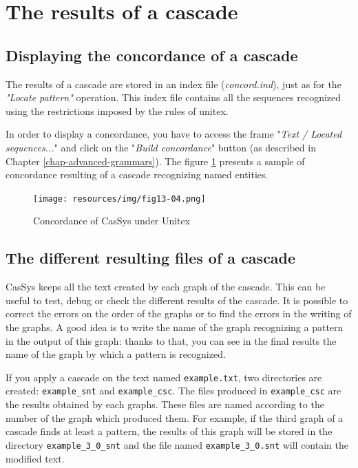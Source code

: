 \section{The results of a cascade}

\subsection{Displaying the concordance of a cascade}
\label{subsec:resultsCascade}

The results of a cascade are stored in an index file (\textit{concord.ind}), just as for the \textit{"Locate pattern"} operation. This index file contains all the sequences recognized using the restrictions imposed by the rules of unitex.

\bigskip
\noindent In order to display a concordance, you have to access the frame "\textit{Text / Located sequences...}" and click on the "\textit{Build concordance}" button (as described in Chapter \ref{chap-advanced-grammars}).
The figure \ref{fig13-04} presents a sample of concordance resulting of a cascade recognizing named entities. 
\begin{figure}[!htb]
  \centering
  \texttt{[image: resources/img/fig13-04.png]}
  \caption{Concordance of CasSys under Unitex}
  \label{fig13-04}
\end{figure}

\subsection{The different resulting files of a cascade}

CasSys keeps all the text created by each graph of the cascade. This can be useful to test, debug or check the different results of the cascade. It is possible to correct the errors on the order of the graphs or to find the errors in the writing of the graphs. A good idea is to write the name of the graph recognizing a pattern in the output of this graph: thanks to that, you can see in the final results the name of the graph by which a pattern is recognized. 
\bigskip

If you apply a cascade on the text named \texttt{example.txt}, two directories are created: \texttt{example\_snt} and \texttt{example\_csc}.
The files produced in \texttt{example\_csc} are the results obtained by each graphs. These files are named according to the number of the graph which produced them. For example, if the third graph of a cascade finds at least a pattern, the results of this graph will be stored in the directory  \texttt{example\_3\_0\_snt} and the file named \texttt{example\_3\_0.snt} will contain the modified text.

